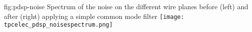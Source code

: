 \begin{dunefigure}
{fig:pdsp-noise}
{Spectrum of the noise on the different   wire planes before
(left) and after (right) applying a simple common mode filter}
\texttt{[image: tpcelec\_pdsp\_noisespectrum.png]}
\end{dunefigure}
